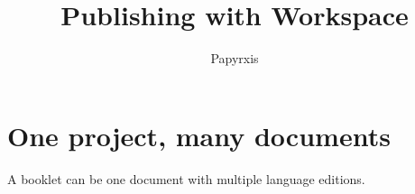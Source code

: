 \documentclass[11pt]{article}
\title{Publishing with Workspace}
\author{Papyrxis}
\begin{document}
\maketitle
\section{One project, many documents}
A booklet can be one document with multiple language editions.
\end{document}
